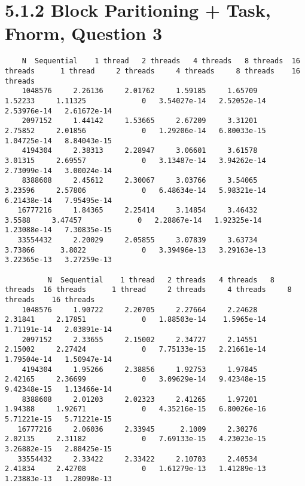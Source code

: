 \documentclass[]{article}
\begin{document}
\section*{5.1.2 Block Paritioning + Task, Fnorm, Question 3}
    \begin{lstlisting}
    N  Sequential    1 thread   2 threads   4 threads   8 threads  16 threads      1 thread     2 threads     4 threads     8 threads    16 threads
    1048576     2.26136     2.01762     1.59185     1.65709     1.52233     1.11325             0   3.54027e-14   2.52052e-14   2.53976e-14   2.61672e-14
    2097152     1.44142     1.53665     2.67209     3.31201     2.75852     2.01856             0   1.29206e-14   6.80033e-15   1.04725e-14   8.84043e-15
    4194304     2.38313     2.28947     3.06601     3.61578     3.01315     2.69557             0   3.13487e-14   3.94262e-14   2.73099e-14   3.00024e-14
    8388608     2.45612     2.30067     3.03766     3.54065     3.23596     2.57806             0   6.48634e-14   5.98321e-14   6.21438e-14   7.95495e-14
   16777216     1.84365     2.25414     3.14854     3.46432      3.5588     3.47457             0   2.28867e-14   1.92325e-14   1.23088e-14   7.30835e-15
   33554432     2.20029     2.05855     3.07839     3.63734     3.73866      3.8022             0   3.39496e-13   3.29163e-13   3.22365e-13   3.27259e-13

          N  Sequential    1 thread   2 threads   4 threads   8 threads  16 threads      1 thread     2 threads     4 threads     8 threads    16 threads
    1048576     1.90722     2.20705     2.27664     2.24628     2.31841     2.17851             0   1.88503e-14    1.5965e-14   1.71191e-14   2.03891e-14
    2097152     2.33655     2.15002     2.34727     2.14551     2.15002     2.27424             0   7.75133e-15   2.21661e-14   1.79504e-14   1.50947e-14
    4194304     1.95266     2.38856     1.92753     1.97845     2.42165     2.36699             0   3.09629e-14   9.42348e-15   9.42348e-15   1.13466e-14
    8388608     2.01203     2.02323     2.41265     1.97201     1.94388     1.92671             0   4.35216e-15   6.80026e-16   5.71221e-15   5.71221e-15
   16777216     2.06036     2.33945      2.1009     2.30276     2.02135     2.31182             0   7.69133e-15   4.23023e-15   3.26882e-15   2.88425e-15
   33554432     2.33422     2.33422     2.10703     2.40534     2.41834     2.42708             0   1.61279e-13   1.41289e-13   1.23883e-13   1.28098e-13   
    \end{lstlisting}
\end{document}
